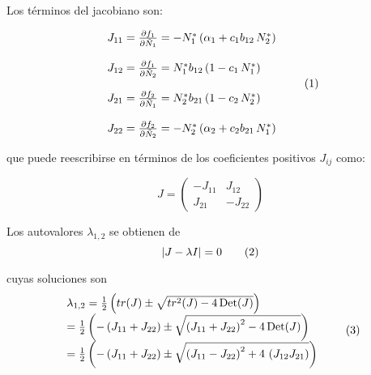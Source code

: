 \noindent Los términos del jacobiano son:

\begin{equation}
\begin{array}{l}
J_{11}= \frac{\partial f_{1}}{\partial \tilde{N}_{1}} =- N^{*}_{1}\left(\alpha_{1}+ c_{1} b_{12} \, N^{*}_2\right)  \\
\\
J_{12}= \frac{\partial f_{1}}{\partial \tilde{N}_{2}} = N^{*}_{1}b_{12}\left(1 - c_{1}\, N^{*}_1\right) \\
\\
J_{21}= \frac{\partial f_{2}}{\partial \tilde{N}_{1}} = N^{*}_{2}b_{21} \left(1 - c_{2}\, N^{*}_2\right) \\
\\
J_{22}= \frac{\partial f_{2}}{\partial \tilde{N}_{2}} = - N^{*}_{2}\left(\alpha_{2}+ c_{2} b_{21}\,N^{*}_{1}\right)
\end{array}
\stepcounter{equation}\tag{\theequation}\label{eq:J11}
\end{equation}

\noindent que puede reescribirse en términos de los coeficientes positivos $J_{ij}$ como:

\begin{equation*}
J = \left(
\begin{array}{rr}
-J_{11} & J_{12} \\ J_{21} & -J_{22}
\end{array}
\right)
\end{equation*}

\noindent Los autovalores $\lambda_{1,2}$ se obtienen de
\begin{equation}
\lvert J - \lambda I \rvert =0
\stepcounter{equation}\tag{\theequation}\label{eq:lambda0App}
\end{equation}

\noindent cuyas soluciones son
\begin{equation}
\begin{array}{lcl}
\lambda _{1,2}=\frac{1}{2}\left(tr(J)\pm \sqrt{tr^{2}(J)-4\,\mathrm{Det}(J)}\right)\\ =
\frac{1}{2}\left(-\left(J_{11}+J_{22}\right)\pm \sqrt{\left(J_{11}+J_{22}\right)^{2}-4\,\mathrm{Det}(J)}\right)\\  =
\frac{1}{2}\left(-\left(J_{11}+J_{22}\right)\pm \sqrt{\left(J_{11}-J_{22}\right)^{2} +4 \,\left( J_{12}J_{21} \right) }\right)
\end{array}
\stepcounter{equation}\tag{\theequation}\label{eq:lambda12}
\end{equation}

